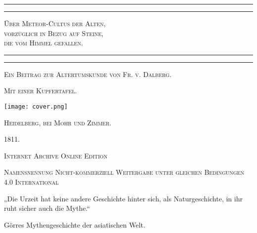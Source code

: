 \documentclass[a4paper, 11pt, oneside, polutonikogreek, german]{article}
\begin{document}
\begin{titlepage} %
	\centering %

	
	\rule{\textwidth}{1.6pt}\vspace*{-\baselineskip}\vspace*{2pt} %
	\rule{\textwidth}{0.4pt} %
	
	{\scshape\LARGE Über Meteor-Cultus der Alten,\\[1.25pt] vorzüglich in Bezug auf Steine,\\[1.25pt] die vom Himmel gefallen.\\[1.25pt]}
	
	\rule{\textwidth}{0.4pt}\vspace*{-\baselineskip}\vspace{3.2pt} %
	\rule{\textwidth}{1.6pt} %

	
	{\scshape Ein Beitrag zur Altertumskunde von Fr. v. Dalberg.} %
	
    {\scshape\scriptsize Mit einer Kupfertafel.} %
    
	
	\texttt{[image: cover.png]}
	
    \vspace*{\fill}

	\vspace{1\baselineskip}

	{\small\scshape Heidelberg, bei Mohr und Zimmer.}
	
	{\small\scshape{1811.}}
	
	\vspace{0.5\baselineskip} %

    \scshape Internet Archive Online Edition  %
	
	{\scshape\small Namensnennung Nicht-kommerziell Weitergabe unter gleichen Bedingungen 4.0 International} %
\end{titlepage}
\setlength{\parskip}{1mm plus1mm minus1mm}
\clearpage
\vspace*{\fill}
\begin{center}
„Die Urzeit hat keine andere Geschichte hinter sich, als Naturgeschichte, in ihr ruht sicher auch die Mythe.“
\end{center}
\begin{center}
Görres Mythengeschichte der asiatischen Welt.
\end{center}
\vspace*{\fill}
\clearpage
\end{document}
